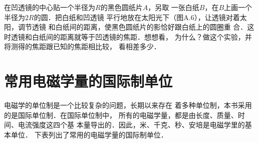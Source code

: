在凹透镜的中心贴一个半径为$R$的黑色圆纸片$A$，另取
一张白纸$B$，在$B$上画一个半径为$2R$的圆．把白纸和凹透镜
平行地放在太阳光下（图A.6），让透镜对着太阳，调节透镜
和白纸间的距离，使黑色圆纸片的影恰好跟白纸上的圆圈重
合．这时透镜和白纸间的距离就等于凹透镜的焦距．想想看，
为什么？做这个实验，并将测得的焦距跟已知的焦距相比较，
看相差多少．















































































\chapter{常用电磁学量的国际制单位}

电磁学的单位制是一个比较复杂的问题，长期以来存在
着多种单位制，本书采用的是国际单位制．在国际单位制中，
所有的电磁学量，都是由长度、质量、时间、电流强度这四个基
本量导出的．因此，米、千克、秒、安培是电磁学里的基本单位．
下表列出了常用的电磁学量的国际制单位．

